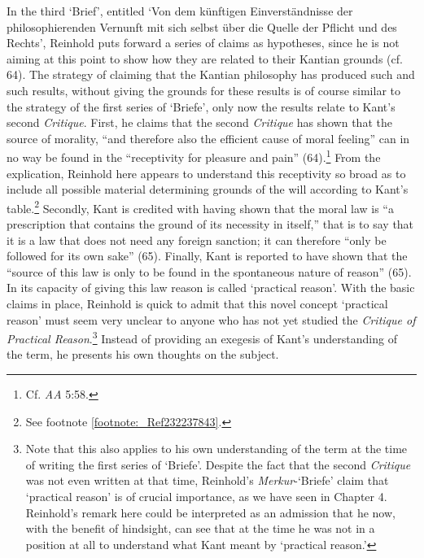 In the third `Brief', entitled `Von dem k\"{u}nftigen Einverst\"{a}ndnisse der philosophierenden Vernunft mit sich selbst \"{u}ber die Quelle der Pflicht und des Rechts', Reinhold puts forward a series of claims as hypotheses, since he is not aiming at this point to show how they are related to their Kantian grounds (cf. 64). The strategy of claiming that the Kantian philosophy has produced such and such results, without giving the grounds for these results is of course similar to the strategy of the first series of `Briefe', only now the results relate to Kant's second \textit{Critique}. First, he claims that the second \textit{Critique }has shown that the source of morality, ``and therefore also the efficient cause of moral feeling'' can in no way be found in the ``receptivity for pleasure and pain'' (64).\footnote{ Cf. \textit{AA} 5:58.} From the explication, Reinhold here appears to understand this receptivity so broad as to include all possible material determining grounds of the will according to Kant's table.\footnote{ See footnote \ref{footnote:_Ref232237843}. } Secondly, Kant is credited with having shown that the moral law is ``a prescription that contains the ground of its necessity in itself,'' that is to say that it is a law that does not need any foreign sanction; it can therefore ``only be followed for its own sake'' (65). Finally, Kant is reported to have shown that the ``source of this law is only to be found in the spontaneous nature of reason'' (65). In its capacity of giving this law reason is called `practical reason'. With the basic claims in place, Reinhold is quick to admit that this novel concept `practical reason' must seem very unclear to anyone who has not yet studied the \textit{Critique of Practical Reason}.\footnote{ Note that this also applies to his own understanding of the term at the time of writing the first series of `Briefe'. Despite the fact that the second \textit{Critique} was not even written at that time, Reinhold's \textit{Merkur}{-}`Briefe' claim that `practical reason' is of crucial importance, as we have seen in Chapter 4. Reinhold's remark here could be interpreted as an admission that he now, with the benefit of hindsight, can see that at the time he was not in a position at all to understand what Kant meant by `practical reason.' } Instead of providing an exegesis of Kant's understanding of the term, he presents his own thoughts on the subject. 

